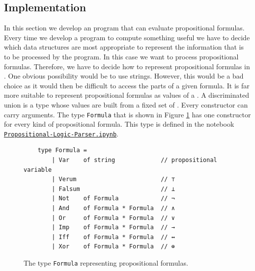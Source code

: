 \subsection{Implementation} 
In this section we develop an \Fsharp{} program that can evaluate propositional formulas.
Every time we develop a program to compute something useful we have to decide which data structures are
most appropriate to represent the information that is to be processed by the program.  In this case we want to
process propositional formulas.  Therefore, we have to decide how to represent propositional formulas in
\Fsharp.  One obvious possibility would be to use strings.  However, this would be a bad choice as it
would then be difficult to access the parts of a given formula.  It is far more suitable to represent
propositional formulas as values of a . 
A discriminated union is a type whose values are built from a fixed set of .
Every constructor can carry arguments.  The type \texttt{Formula} that is shown in Figure
\ref{fig:Formula.fs} has one constructor for every kind of propositional formula.  This type is defined in the notebook
\href{https://github.com/karlstroetmann/Logic/blob/master/F-Sharp/Chapter-4/Propositional-Logic-Parser.ipynb}{\texttt{Propositional-Logic-Parser.ipynb}}.

\begin{figure}[!ht]
  \centering
\begin{verbatim}
    type Formula =
        | Var    of string             // propositional variable
        | Verum                        // ⊤
        | Falsum                       // ⊥
        | Not    of Formula            // ¬
        | And    of Formula * Formula  // ∧
        | Or     of Formula * Formula  // ∨
        | Imp    of Formula * Formula  // →
        | Iff    of Formula * Formula  // ↔
        | Xor    of Formula * Formula  // ⊕
\end{verbatim}
\vspace*{-0.3cm}
  \caption{The type \texttt{Formula} representing propositional formulas.}
  \label{fig:Formula.fs}
\end{figure} 

